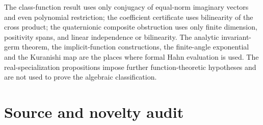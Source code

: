 \documentclass[11pt,oneside]{article}
\numberwithin{equation}{section}
\theoremstyle{plain}
\theoremstyle{definition}
\theoremstyle{remark}
\begin{document}
The class-function result uses only conjugacy of equal-norm imaginary vectors and even polynomial restriction; the coefficient certificate uses bilinearity of the cross product; the quaternionic composite obstruction uses only finite dimension, positivity spans, and linear independence or bilinearity. The analytic invariant-germ theorem, the implicit-function constructions, the finite-angle exponential and the Kuranishi map are the places where formal Hahn evaluation is used. The real-specialization propositions impose further function-theoretic hypotheses and are not used to prove the algebraic classification.

\section{Source and novelty audit}\label{qgs:app:audit}
\end{document}
